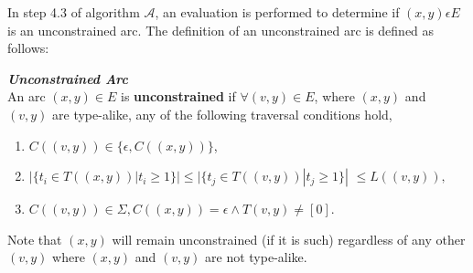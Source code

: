 \newpage
In step 4.3 of algorithm ${\mathcal{A}}$, an evaluation is performed to determine if $(x,y) \epsilon E$ is an unconstrained arc. The definition of an unconstrained arc is defined as follows:
\begin{defn} \label{unconstrainedarc}
    \textit{\textbf{Unconstrained Arc}}\\
    An arc $(x, y) \in E$ is \textbf{unconstrained} if $\forall (v,y) \in E$, where $(x,y)$ and $(v,y)$ are type-alike, any of the following traversal conditions hold, 
    \begin{enumerate}
        \item $C((v,y)) \in \{\epsilon, C((x,y))\}$,
        \item { $|\{t_i \in T((x,y))|t_i \geq 1\}| \leq  |\{t_j \in T((v,y))|t_j \geq 1\}|$ $\leq L((v,y)),$}
        \item $C((v,y)) \in \Sigma, C((x,y)) = \epsilon \wedge T(v,y) \neq [0]$.
    \end{enumerate}
    Note that $(x,y)$ will remain unconstrained (if it is such) regardless of any other $(v,y)$ where $(x,y)$ and $(v,y)$ are not type-alike.
\end{defn}
